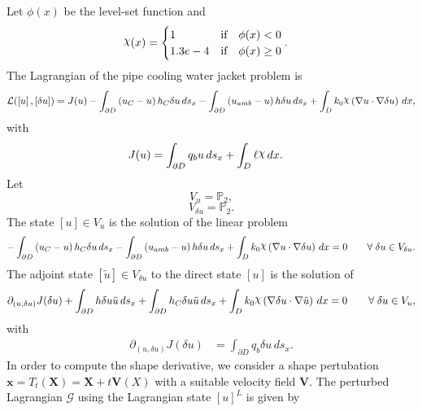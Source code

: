 \documentclass[preview]{standalone}
\let\oldcdot\cdot
\let\cdot\oldcdot
\begin{document}
Let $\phi(x)$ be the level-set function and
 \begin{align*}\raisebox{\depth}{$\chi$}(x) &= \begin{cases} 1 & \mbox{if}\quad \phi(x) < 0 \\ 1.3e-4 & \mbox{if}\quad \phi(x)  \ge 0 \end{cases}.\end{align*}
The Lagrangian of the pipe cooling water jacket problem is
\begin{dmath*}
\mathcal L(\left[ u\right],\left[ \delta u\right]) = J(u) -  \int_{\partial D} \left(u_{C} - u\right) h_{C} \delta u \,ds_x -  \int_{\partial D} \left(u_{amb} - u\right) h \delta u \,ds_x +  \int_{D} k_{0} \raisebox{\depth}{$\chi$} \left(  \nabla u  \cdot  \nabla \delta u  \right) \,dx , 
\end{dmath*}
with 
\begin{align*}
J(u) &=  \int_{\partial D} q_{b} u \,ds_x +  \int_{D} \ell \raisebox{\depth}{$\chi$} \,dx.
 \end{align*}
Let
\begin{equation*}
V_{u} = \mathbb P_{2},\end{equation*}
\begin{equation*}
V_{\delta u} = \mathbb P_{2}.\end{equation*}
The state $\left[ u\right] \in  V_{u}$ is the solution of the linear problem
\begin{dmath*}
-  \int_{\partial D} \left(u_{C} - u\right) h_{C} \delta u \,ds_x -  \int_{\partial D} \left(u_{amb} - u\right) h \delta u \,ds_x +  \int_{D} k_{0} \raisebox{\depth}{$\chi$} \left(  \nabla u  \cdot  \nabla \delta u  \right) \,dx = 0\qquad \forall\; {\delta u\in V_{\delta u}} . 
\end{dmath*}
The adjoint state $\left[ \tilde u\right] \in  V_{\delta u}$ to the direct state $\left[ u\right]$ is the solution of
\begin{dmath*}
\partial_{(u,\delta u)} J(\delta u) +  \int_{\partial D} h \delta u \tilde u \,ds_x +  \int_{\partial D} h_{C} \delta u \tilde u \,ds_x +  \int_{D} k_{0} \raisebox{\depth}{$\chi$} \left(  \nabla \delta u  \cdot  \nabla \tilde u  \right) \,dx = 0\qquad \forall\; {\delta u\in V_{u}} , 
\end{dmath*}
with 
\begin{align*}
\partial_{(u,\delta u)} J(\delta u) &=  \int_{\partial D} q_{b} \delta u \,ds_x.
 \end{align*}
In order to compute the shape derivative, we consider a shape pertubation $\mathbf x = T_t(\mathbf X) = \mathbf X + t \mathbf  V(X)$ with a suitable velocity field $\mathbf V$. The perturbed Lagrangian $\mathcal G$ using the Lagrangian state $\left[ u\right]^{L}$ is given by
\end{document}
